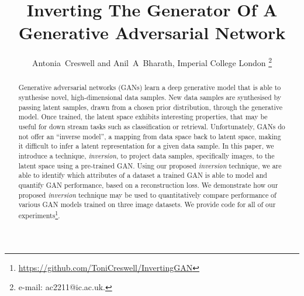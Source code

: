 \documentclass[journal]{IEEEtran}
\begin{document}
\title{Inverting The Generator Of A Generative Adversarial Network}



\author{Antonia~Creswell and Anil~A~Bharath, Imperial College London
\thanks{e-mail: ac2211@ic.ac.uk.}}











\maketitle

\begin{abstract}


Generative adversarial networks (GANs) learn a deep generative model that is able to synthesise novel, high-dimensional data samples. New data samples are synthesised by passing latent samples, drawn from a chosen prior distribution, through the generative model. Once trained, the latent space exhibits interesting properties, that may be useful for down stream tasks such as classification or retrieval. Unfortunately, GANs do not offer an ``inverse model'', a mapping from data space back to latent space, making it difficult to infer a latent representation for a given data sample. In this paper, we introduce a technique, \textit{inversion}, to project data samples, specifically images, to the latent space using a pre-trained GAN. Using our proposed \textit{inversion} technique, we are able to identify which attributes of a dataset a trained GAN is able to model and quantify GAN performance, based on a reconstruction loss. We demonstrate how our proposed \textit{inversion} technique may be used to quantitatively compare performance of various GAN models trained on three image datasets. We provide code for all of our experiments\footnote{\url{https://github.com/ToniCreswell/InvertingGAN}}.




\end{abstract}







\IEEEpeerreviewmaketitle




 
\end{document}

